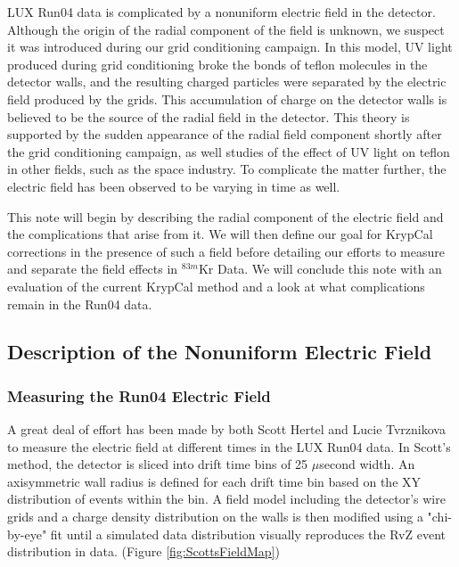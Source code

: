 \documentclass[a4paper,12pt]{article}
\begin{document}
{LUX Run04 data is complicated by a nonuniform electric field in the detector.  Although the origin of the radial component of the field is unknown, we suspect it was introduced during our grid conditioning campaign.  In this model, UV light produced during grid conditioning broke the bonds of teflon molecules in the detector walls, and the resulting charged particles were separated by the electric field produced by the grids.  This accumulation of charge on the detector walls is believed to be the source of the radial field in the detector.  This theory is supported by the sudden appearance of the radial field component shortly after the grid conditioning campaign, as well studies of the effect of UV light on teflon in other fields, such as the space industry.  \cite{GridCond, Dever}  To complicate the matter further, the electric field has been observed to be varying in time as well.

  
This note will begin by describing the radial component of the electric field and the complications that arise from it.  We will then define our goal for KrypCal corrections in the presence of such a field before detailing our efforts to measure and separate the field effects in  $^{83m}$Kr Data.  We will conclude this note with an evaluation of the current KrypCal method and a look at what complications remain in the Run04 data.

\subsection{Description of the Nonuniform Electric Field}

\subsubsection{Measuring the Run04 Electric Field} \label{section:DescribingField}

A great deal of effort has been made by both Scott Hertel and Lucie Tvrznikova to measure the electric field at different times in the LUX Run04 data.  In Scott's method, the detector is sliced into drift time bins of 25 $\mu$second width.  An axisymmetric wall radius is defined for each drift time bin based on the XY distribution of events within the bin.  A field model including the detector's wire grids and a charge density distribution on the walls is then modified using a "chi-by-eye" fit until a simulated data distribution visually reproduces the RvZ event distribution in data. (Figure \ref{fig:ScottsFieldMap}) \cite{ScottsMap}

}
\end{document}
